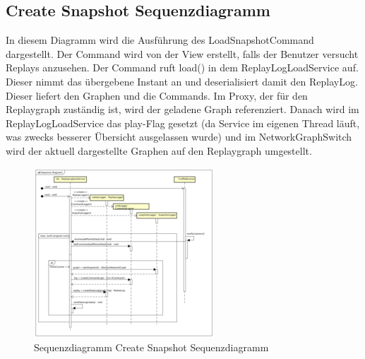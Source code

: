 \subsection{Create Snapshot Sequenzdiagramm}

In diesem Diagramm wird die Ausführung des LoadSnapshotCommand dargestellt. Der Command wird von der View erstellt, falls der Benutzer versucht Replays anzusehen. Der Command ruft load() in dem ReplayLogLoadService auf. Dieser nimmt das übergebene Instant an und deserialisiert damit den ReplayLog. Dieser liefert den Graphen und die Commands. Im Proxy, der für den Replaygraph zuständig ist, wird der geladene Graph referenziert. Danach wird im ReplayLogLoadService das play-Flag gesetzt (da Service im eigenen Thread läuft, was zwecks besserer Übersicht ausgelassen wurde) und im NetworkGraphSwitch wird der aktuell dargestellte Graphen auf den Replaygraph umgestellt.

\begin{figure}[H]
  \centering
  \includegraphics[width=\textwidth]{../diagramimages/sd_createsnapshot.png}
  \caption[Sequenzdiagramm Create Snapshot Sequenzdiagramm]{Sequenzdiagramm Create Snapshot Sequenzdiagramm}
\end{figure}